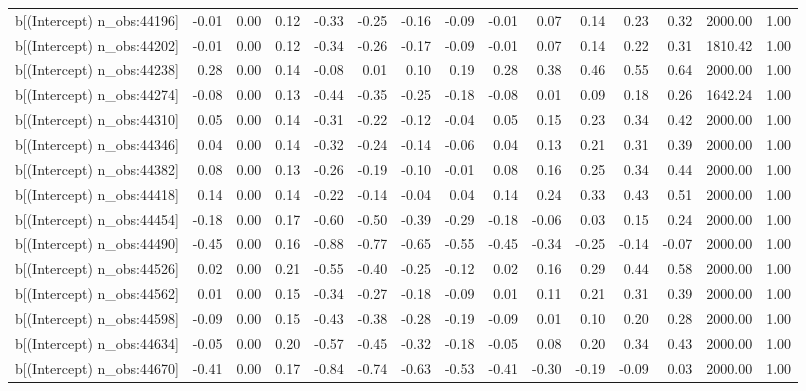 \begin{table}[ht]
\begin{tabular}{rrrrrrrrrrrrrrr}
  b[(Intercept) n\_obs:44196] & -0.01 & 0.00 & 0.12 & -0.33 & -0.25 & -0.16 & -0.09 & -0.01 & 0.07 & 0.14 & 0.23 & 0.32 & 2000.00 & 1.00 \\ 
  b[(Intercept) n\_obs:44202] & -0.01 & 0.00 & 0.12 & -0.34 & -0.26 & -0.17 & -0.09 & -0.01 & 0.07 & 0.14 & 0.22 & 0.31 & 1810.42 & 1.00 \\ 
  b[(Intercept) n\_obs:44238] & 0.28 & 0.00 & 0.14 & -0.08 & 0.01 & 0.10 & 0.19 & 0.28 & 0.38 & 0.46 & 0.55 & 0.64 & 2000.00 & 1.00 \\ 
  b[(Intercept) n\_obs:44274] & -0.08 & 0.00 & 0.13 & -0.44 & -0.35 & -0.25 & -0.18 & -0.08 & 0.01 & 0.09 & 0.18 & 0.26 & 1642.24 & 1.00 \\ 
  b[(Intercept) n\_obs:44310] & 0.05 & 0.00 & 0.14 & -0.31 & -0.22 & -0.12 & -0.04 & 0.05 & 0.15 & 0.23 & 0.34 & 0.42 & 2000.00 & 1.00 \\ 
  b[(Intercept) n\_obs:44346] & 0.04 & 0.00 & 0.14 & -0.32 & -0.24 & -0.14 & -0.06 & 0.04 & 0.13 & 0.21 & 0.31 & 0.39 & 2000.00 & 1.00 \\ 
  b[(Intercept) n\_obs:44382] & 0.08 & 0.00 & 0.13 & -0.26 & -0.19 & -0.10 & -0.01 & 0.08 & 0.16 & 0.25 & 0.34 & 0.44 & 2000.00 & 1.00 \\ 
  b[(Intercept) n\_obs:44418] & 0.14 & 0.00 & 0.14 & -0.22 & -0.14 & -0.04 & 0.04 & 0.14 & 0.24 & 0.33 & 0.43 & 0.51 & 2000.00 & 1.00 \\ 
  b[(Intercept) n\_obs:44454] & -0.18 & 0.00 & 0.17 & -0.60 & -0.50 & -0.39 & -0.29 & -0.18 & -0.06 & 0.03 & 0.15 & 0.24 & 2000.00 & 1.00 \\ 
  b[(Intercept) n\_obs:44490] & -0.45 & 0.00 & 0.16 & -0.88 & -0.77 & -0.65 & -0.55 & -0.45 & -0.34 & -0.25 & -0.14 & -0.07 & 2000.00 & 1.00 \\ 
  b[(Intercept) n\_obs:44526] & 0.02 & 0.00 & 0.21 & -0.55 & -0.40 & -0.25 & -0.12 & 0.02 & 0.16 & 0.29 & 0.44 & 0.58 & 2000.00 & 1.00 \\ 
  b[(Intercept) n\_obs:44562] & 0.01 & 0.00 & 0.15 & -0.34 & -0.27 & -0.18 & -0.09 & 0.01 & 0.11 & 0.21 & 0.31 & 0.39 & 2000.00 & 1.00 \\ 
  b[(Intercept) n\_obs:44598] & -0.09 & 0.00 & 0.15 & -0.43 & -0.38 & -0.28 & -0.19 & -0.09 & 0.01 & 0.10 & 0.20 & 0.28 & 2000.00 & 1.00 \\ 
  b[(Intercept) n\_obs:44634] & -0.05 & 0.00 & 0.20 & -0.57 & -0.45 & -0.32 & -0.18 & -0.05 & 0.08 & 0.20 & 0.34 & 0.43 & 2000.00 & 1.00 \\ 
  b[(Intercept) n\_obs:44670] & -0.41 & 0.00 & 0.17 & -0.84 & -0.74 & -0.63 & -0.53 & -0.41 & -0.30 & -0.19 & -0.09 & 0.03 & 2000.00 & 1.00 \\ 

\end{tabular}
\end{table}
